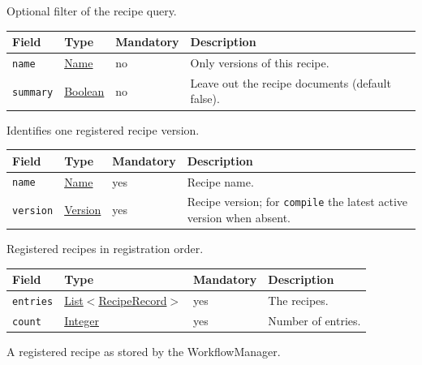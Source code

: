 \documentclass[a4paper]{arrowhead}
\newcommand{\mref}[1]{{\textcolor{ArrowheadPurple}{\hyperref[sec:model:#1]{#1}}}}
\newcommand{\pref}[1]{{\textcolor{ArrowheadGrey}{\hyperref[sec:model:primitives:#1]{#1}}}}
\begin{document}
Optional filter of the recipe query.

{\small
\begin{longtable}{|p{3.7cm}|p{4.2cm}|p{1.6cm}|p{6.3cm}|}

\hline
\rowcolor{gray!33} Field & Type & Mandatory & Description \\ \hline
\endhead
\texttt{name} & \pref{Name} & no & Only versions of this recipe. \\ \hline
\texttt{summary} & \pref{Boolean} & no & Leave out the recipe documents (default false). \\ \hline
\end{longtable}
}

Identifies one registered recipe version.

{\small
\begin{longtable}{|p{3.7cm}|p{4.2cm}|p{1.6cm}|p{6.3cm}|}

\hline
\rowcolor{gray!33} Field & Type & Mandatory & Description \\ \hline
\endhead
\texttt{name} & \pref{Name} & yes & Recipe name. \\ \hline
\texttt{version} & \pref{Version} & yes & Recipe version; for \texttt{compile} the latest active version when absent. \\ \hline
\end{longtable}
}

Registered recipes in registration order.

{\small
\begin{longtable}{|p{3.7cm}|p{4.2cm}|p{1.6cm}|p{6.3cm}|}

\hline
\rowcolor{gray!33} Field & Type & Mandatory & Description \\ \hline
\endhead
\texttt{entries} & \pref{List}$<$\mref{RecipeRecord}$>$ & yes & The recipes. \\ \hline
\texttt{count} & \pref{Integer} & yes & Number of entries. \\ \hline
\end{longtable}
}

A registered recipe as stored by the WorkflowManager.
\end{document}

